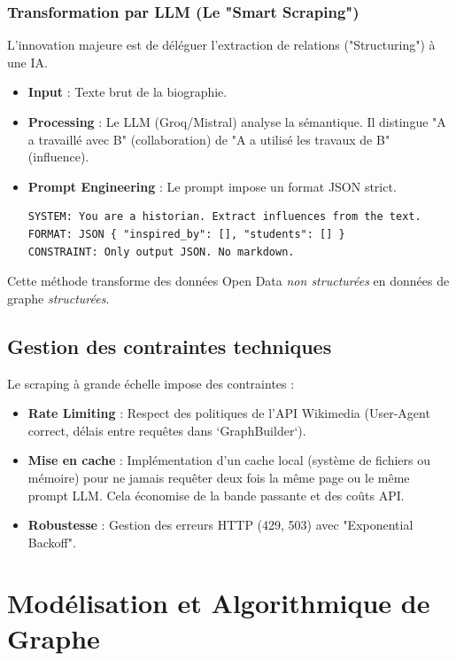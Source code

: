 \documentclass[12pt,a4paper]{report}
\begin{document}
\subsection{Transformation par LLM (Le "Smart Scraping")}
L'innovation majeure est de déléguer l'extraction de relations ("Structuring") à une IA.
\begin{itemize}
    \item \textbf{Input} : Texte brut de la biographie.
    \item \textbf{Processing} : Le LLM (Groq/Mistral) analyse la sémantique. Il distingue "A a travaillé avec B" (collaboration) de "A a utilisé les travaux de B" (influence).
    \item \textbf{Prompt Engineering} : Le prompt impose un format JSON strict.
    \begin{codebg}
\begin{verbatim}
SYSTEM: You are a historian. Extract influences from the text.
FORMAT: JSON { "inspired_by": [], "students": [] }
CONSTRAINT: Only output JSON. No markdown.
\end{verbatim}
    \end{codebg}
\end{itemize}
Cette méthode transforme des données Open Data \textit{non structurées} en données de graphe \textit{structurées}.

\section{Gestion des contraintes techniques}
Le scraping à grande échelle impose des contraintes :
\begin{itemize}
    \item \textbf{Rate Limiting} : Respect des politiques de l'API Wikimedia (User-Agent correct, délais entre requêtes dans `GraphBuilder`).
    \item \textbf{Mise en cache} : Implémentation d'un cache local (système de fichiers ou mémoire) pour ne jamais requêter deux fois la même page ou le même prompt LLM. Cela économise de la bande passante et des coûts API.
    \item \textbf{Robustesse} : Gestion des erreurs HTTP (429, 503) avec "Exponential Backoff".
\end{itemize}

\chapter{Modélisation et Algorithmique de Graphe}
\end{document}
